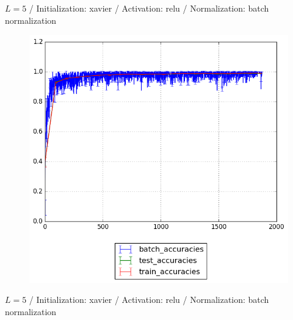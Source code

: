 \documentclass{beamer}
\begin{document}
{	%
	\begin{frame}[t]{}{}%
		\vfill
		\begin{center}
			{$L = 5$ / Initialization: xavier / Activation: relu / Normalization: batch normalization}
		\end{center}
    		\begin{figure}
    			\centering
    			\includegraphics[scale=0.4]{gfx/l5b32_relu_xavier_batch_normalization_cnn_accuracies}
    		\end{figure}
    		\vfill
	\end{frame}
	\begin{frame}[t]{}{}%
		\vfill
		\begin{center}
			{$L = 5$ / Initialization: xavier / Activation: relu / Normalization: batch normalization}
		\end{center}
    		\begin{figure}
    			\centering

\end{figure}
\end{frame}}
\end{document}
